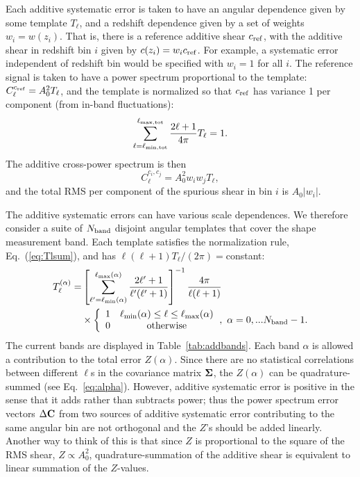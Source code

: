 \documentclass[aps,prd, amsmath,amssymb,superscriptaddress,showkeys,nofootinbib,reprint,preprintnumbers]{revtex4-1}
\begin{document}
Each additive systematic error is taken to have an angular dependence
given by some template $T_\ell$, and a redshift dependence given by a
set of weights $w_i=w(z_i)$. That is, there is a reference additive
shear $c_{\rm ref}$, with the additive shear in redshift bin $i$ given
by $c(z_i) = w_ic_{\rm ref}$. For example, a systematic error
independent of redshift bin would be specified with $w_i=1$ for all
$i$. The reference signal is taken to have a power spectrum
proportional to the template: $C_\ell^{c_{\rm ref}} = A_0^2T_\ell$,
and the template is normalized so that $c_{\rm ref}$ has variance 1
per component (from in-band fluctuations):
\begin{equation}
\sum_{\ell=\ell_{\rm min,tot}}^{\ell_{\rm max,tot}} \frac{2\ell+1}{4\pi} T_\ell = 1.
\label{eq:Tlsum}
\end{equation}
The additive cross-power spectrum is then
\begin{equation}
C_\ell^{c_i,c_j} = A_0^2 w_iw_jT_\ell,
\end{equation}
and the total RMS per component of the spurious shear in bin $i$ is $A_0|w_i|$.

The additive systematic errors can have various scale dependences. We
therefore consider a suite of $N_{\rm band}$ disjoint angular
templates that cover the shape measurement band. Each template
satisfies the normalization rule, Eq.~(\ref{eq:Tlsum}), and has
$\ell(\ell+1)T_\ell/(2\pi)=$constant:
\begin{align}
T_\ell^{(\alpha)} = &\left[ \sum_{\ell'=\ell_{\rm min}(\alpha)}^{\ell_{\rm max}(\alpha)} \frac{2\ell'+1}{\ell'(\ell'+1)} \right]^{-1} \frac{4\pi}{\ell(\ell+1)}\nonumber\\
&\times\left\{ \begin{array}{cc} 1 & \ell_{\rm min}(\alpha)\le\ell\le\ell_{\rm max}(\alpha) \\ 0 & {\rm otherwise} \end{array} \right.\!,~\alpha=0,...N_{\rm band}-1.
\end{align}
The current bands are displayed in Table~\ref{tab:addbands}. Each band
$\alpha$ is allowed a contribution to the total error
$Z(\alpha)$. Since there are no statistical correlations between
different $\ell$s in the covariance matrix ${\bf\Sigma}$, the
$Z(\alpha)$ can be quadrature-summed (see
Eq.~\ref{eq:alpha}). However, additive systematic error is positive in
the sense that it adds rather than subtracts power; thus the power
spectrum error vectors $\Delta{\bf C}$ from two sources of additive
systematic error contributing to the same angular bin are not
orthogonal and the $Z$'s should be added linearly. Another way to
think of this is that since $Z$ is proportional to the square of the
RMS shear, $Z\propto A_0^2$, quadrature-summation of the additive
shear is equivalent to linear summation of the $Z$-values.
\end{document}
